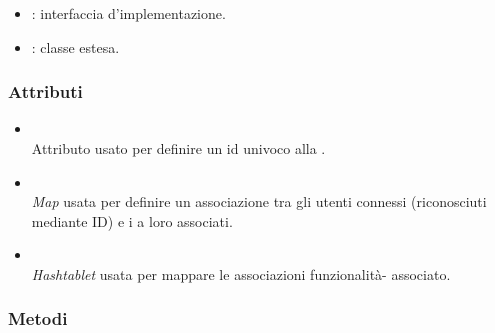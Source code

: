 \begin{itemize}
	\item {}: interfaccia d'implementazione.
	\item {}: classe estesa.
\end{itemize}

\subsubsection*{Attributi}

\begin{itemize}
	\item{}\\
	Attributo usato per definire un id univoco alla .
	\item{}\\
	\textit{Map} usata per definire un associazione tra gli utenti connessi (riconosciuti mediante ID) e i  a loro associati.
	\item{}\\
	\textit{Hashtablet} usata per mappare le associazioni funzionalità- associato.
\end{itemize}

\subsubsection*{Metodi}

